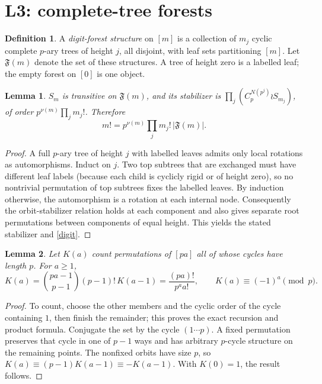 \documentclass[10pt]{article}
\newtheorem{lemma}{Lemma}
\theoremstyle{definition}\newtheorem*{definition}{Definition}
\theoremstyle{remark}\newtheorem*{remark}{Remark}
\newcommand{\F}{\mathfrak F}
\begin{document}
\section{L3: complete-tree forests}
\begin{definition} A \emph{digit-forest structure} on $[m]$ is a collection of
$m_j$ cyclic complete $p$-ary trees of height $j$, all disjoint, with leaf sets
partitioning $[m]$. Let $\F(m)$ denote the set of these structures. A tree of
height zero is a labelled leaf; the empty forest on $[0]$ is one object.\end{definition}
\begin{lemma}\label{stabilizer} $S_m$ is transitive on $\F(m)$, and its
stabilizer is $\prod_j(C_p^{N(p^j)}\wr S_{m_j})$, of order
$p^{\nu(m)}\prod_jm_j!$. Therefore
\begin{equation}\label{digit}
 m!=p^{\nu(m)}\prod_jm_j!\,|\F(m)|.
\end{equation}\end{lemma}
\begin{proof} A full $p$-ary tree of height $j$ with labelled leaves admits
only local rotations as automorphisms. Induct on $j$. Two top subtrees that
are exchanged must have different leaf labels (because each child is cyclicly
rigid or of height zero), so no nontrivial permutation of top subtrees fixes
the labelled leaves. By induction otherwise, the automorphism is a rotation
at each internal node. Consequently the orbit-stabilizer relation holds at
each component and also gives separate root permutations between components
of equal height. This yields the stated stabilizer and \eqref{digit}.\end{proof}

\begin{lemma}\label{K} Let $K(a)$ count permutations of $[pa]$ all of whose
cycles have length $p$. For $a\ge1$,
\begin{equation}\label{Kexact}
 K(a)=\binom{pa-1}{p-1}(p-1)!\,K(a-1)=\frac{(pa)!}{p^aa!},\qquad
 K(a)\equiv(-1)^a\pmod p.
\end{equation}\end{lemma}
\begin{proof} To count, choose the other members and the cyclic order of the
cycle containing $1$, then finish the remainder; this proves the exact
recursion and product formula. Conjugate the set by the cycle $(1\cdots p)$.
A fixed permutation preserves that cycle in one of $p-1$ ways and has arbitrary
$p$-cycle structure on the remaining points. The nonfixed orbits have size $p$,
so $K(a)\equiv(p-1)K(a-1)\equiv-K(a-1)$. With $K(0)=1$, the result follows.\end{proof}
\end{document}
